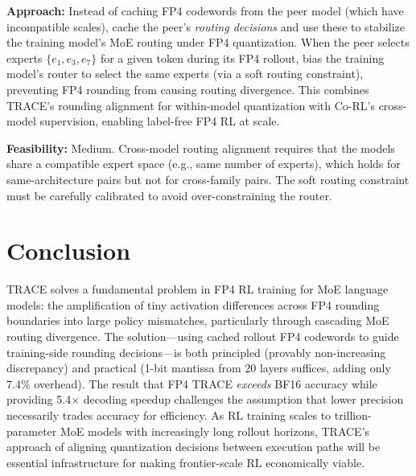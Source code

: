 \documentclass[11pt,a4paper]{article}
\begin{document}
\textbf{Approach:} Instead of caching FP4 codewords from the peer model (which have incompatible scales), cache the peer's \emph{routing decisions} and use these to stabilize the training model's MoE routing under FP4 quantization. When the peer selects experts $\{e_1, e_3, e_7\}$ for a given token during its FP4 rollout, bias the training model's router to select the same experts (via a soft routing constraint), preventing FP4 rounding from causing routing divergence. This combines TRACE's rounding alignment for within-model quantization with Co-RL's cross-model supervision, enabling label-free FP4 RL at scale.

\textbf{Feasibility:} Medium. Cross-model routing alignment requires that the models share a compatible expert space (e.g., same number of experts), which holds for same-architecture pairs but not for cross-family pairs. The soft routing constraint must be carefully calibrated to avoid over-constraining the router.

\section{Conclusion}
TRACE solves a fundamental problem in FP4 RL training for MoE language models: the amplification of tiny activation differences across FP4 rounding boundaries into large policy mismatches, particularly through cascading MoE routing divergence. The solution---using cached rollout FP4 codewords to guide training-side rounding decisions---is both principled (provably non-increasing discrepancy) and practical (1-bit mantissa from 20 layers suffices, adding only 7.4\% overhead). The result that FP4 TRACE \emph{exceeds} BF16 accuracy while providing 5.4$\times$ decoding speedup challenges the assumption that lower precision necessarily trades accuracy for efficiency. As RL training scales to trillion-parameter MoE models with increasingly long rollout horizons, TRACE's approach of aligning quantization decisions between execution paths will be essential infrastructure for making frontier-scale RL economically viable.
\end{document}
